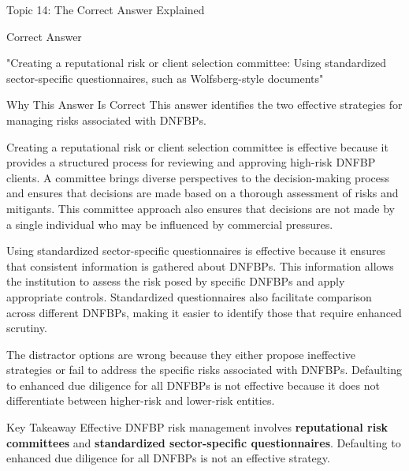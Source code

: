 \documentclass[8pt]{beamer}  %
\newcommand{\correct}{\textcolor{correctgreen}{\ding{51}}}
\begin{document}
	\begin{frame}{Topic 14: The Correct Answer Explained}
		\begin{block}{\large \correct \textcolor{correctgreen}{Correct Answer}}
			\begin{center}
				\Large "Creating a reputational risk or client selection committee: Using standardized sector-specific questionnaires, such as Wolfsberg-style documents"
			\end{center}
		\end{block}
		
		\vspace{0.2cm}
		\begin{block}{\large Why This Answer Is Correct}
			This answer identifies the two effective strategies for managing risks associated with DNFBPs.
			
			Creating a reputational risk or client selection committee is effective because it provides a structured process for reviewing and approving high-risk DNFBP clients. A committee brings diverse perspectives to the decision-making process and ensures that decisions are made based on a thorough assessment of risks and mitigants. This committee approach also ensures that decisions are not made by a single individual who may be influenced by commercial pressures.
			
			Using standardized sector-specific questionnaires is effective because it ensures that consistent information is gathered about DNFBPs. This information allows the institution to assess the risk posed by specific DNFBPs and apply appropriate controls. Standardized questionnaires also facilitate comparison across different DNFBPs, making it easier to identify those that require enhanced scrutiny.
			
			The distractor options are wrong because they either propose ineffective strategies or fail to address the specific risks associated with DNFBPs. Defaulting to enhanced due diligence for all DNFBPs is not effective because it does not differentiate between higher-risk and lower-risk entities.
		\end{block}
		
		\begin{alertblock}{Key Takeaway}
			Effective DNFBP risk management involves \textbf{reputational risk committees} and \textbf{standardized sector-specific questionnaires}. Defaulting to enhanced due diligence for all DNFBPs is not an effective strategy.
		\end{alertblock}
	\end{frame}
	
\end{document}
